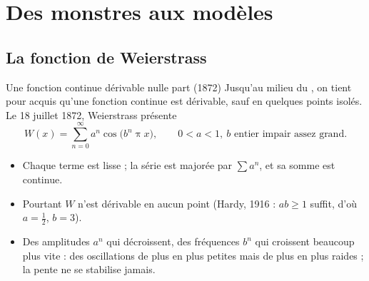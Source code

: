 \section{Des monstres aux modèles}

\subsection{La fonction de Weierstrass}

\begin{frame}{Une fonction continue dérivable nulle part (1872)}
  \small Jusqu'au milieu du , on tient pour acquis qu'une
  fonction continue est dérivable, sauf en quelques points isolés. Le
  18 juillet 1872, Weierstrass présente
  \[
    W(x) = \sum_{n=0}^{\infty} a^n\cos\big(b^n\uppi x\big),
    \qquad 0<a<1,\ b \text{ entier impair assez grand.}
  \]
  \begin{itemize}
    \item Chaque terme est lisse ; la série est majorée par $\sum a^n$,
      et sa somme est continue.
    \item Pourtant $W$ n'est dérivable en aucun point (Hardy, 1916 :
      $ab\geq1$ suffit, d'où $a=\tfrac12$, $b=3$).
    \item Des amplitudes $a^n$ qui décroissent, des fréquences $b^n$ qui
      croissent beaucoup plus vite : des oscillations de plus en plus
      petites mais de plus en plus raides ; la pente ne se stabilise
      jamais.
  \end{itemize}
\end{frame}

